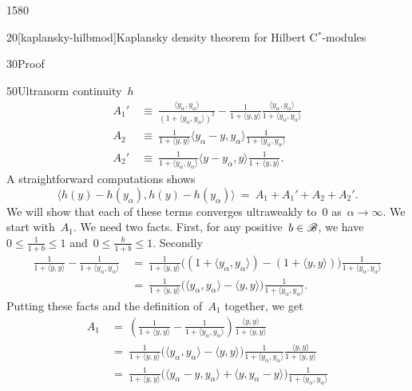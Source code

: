 \begin{parsec}{1580}
\begin{point}{20}[kaplansky-hilbmod]{Kaplansky density theorem for Hilbert C$^*$-modules}
\begin{point}{30}{Proof}
\begin{point}{50}{Ultranorm continuity~$h$}
\begin{align*}
    A_1' & \ \equiv \ 
    \frac{\langle y_\alpha,y_\alpha\rangle}{(1 + \langle y_\alpha,y_\alpha \rangle)^2}  
    - \frac{1}{1+\langle y,y \rangle}
    \frac{\langle y_\alpha,y_\alpha\rangle}{1+\langle y_\alpha,y_\alpha \rangle} \\
    A_2 & \ \equiv \ 
    \frac{1}{1+ \langle y,y \rangle}
       \langle y_\alpha- y, y_\alpha\rangle
     \frac{1}{1+ \langle y_\alpha,y_\alpha \rangle} \\
    A_2' & \ \equiv \  \frac{1}{1+ \langle y_\alpha,y_\alpha \rangle}
       \langle y- y_\alpha, y\rangle
     \frac{1}{1+ \langle y,y \rangle}.
\end{align*}
A straightforward computations shows
\begin{equation}\label{kaplansky-splitting}
    \langle h(y) - h(y_\alpha) ,
         h(y) - h(y_\alpha) \rangle  \ = \ A_1 + A_1' + A_2 + A_2'.
\end{equation}
We will show that each of these terms converges ultraweakly to~$0$
 as~$\alpha \to \infty$.
We start with~$A_1$.
We need two facts.
First, for any positive~$b \in \mathscr{B}$, we have~$0 \leq \frac{1}{1+b} \leq 1$
and~$0 \leq \frac{b}{1+b} \leq 1$.
Secondly
\begin{align*}
    \frac{1}{1+\langle y,y\rangle }
        -
    \frac{1}{1+\langle y_\alpha,y_\alpha\rangle }
    & \ = \ 
    \frac{1}{1+\langle y,y\rangle }
    \bigl((1+\langle y_\alpha,y_\alpha \rangle) - (1+\langle y,y \rangle)\bigr) 
    \frac{1}{1+\langle y_\alpha,y_\alpha\rangle }\\
    & \ = \ 
    \frac{1}{1+\langle y,y\rangle }
   \bigl(\langle y_\alpha,y_\alpha \rangle - \langle y,y \rangle\bigr) 
    \frac{1}{1+\langle y_\alpha,y_\alpha\rangle }.
\end{align*}
Putting these facts and the definition of~$A_1$ together, we get
\begin{align*}
     A_1 
    &\ = \ 
    \left(
    \frac{1}{1+\langle y,y\rangle } -
    \frac{1}{1+\langle y_\alpha,y_\alpha\rangle }\right)
            \frac{\langle y,y \rangle}{1+\langle y,y \rangle} \\
    &\ = \ 
    \frac{1}{1+\langle y,y\rangle }
   \bigl(\langle y_\alpha,y_\alpha \rangle - \langle y,y \rangle\bigr) 
    \frac{1}{1+\langle y_\alpha,y_\alpha\rangle }
            \frac{\langle y,y \rangle}{1+\langle y,y \rangle} \\
    &\ = \ 
    \frac{1}{1+\langle y,y\rangle }
   \bigl(\langle y_\alpha -y,y_\alpha \rangle + \langle y,y_\alpha - y \rangle\bigr) 
    \frac{1}{1+\langle y_\alpha,y_\alpha\rangle }

\end{align*}
\end{point}
\end{point}
\end{point}
\end{parsec}
